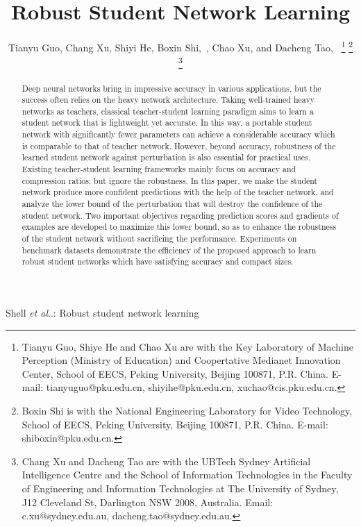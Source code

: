 \documentclass[journal]{IEEEtran}
\makeatletter
\DeclareRobustCommand\onedot{\futurelet\@let@token\@onedot}
\def\@onedot{\ifx\@let@token.\else.\null\fi\xspace}
\def\etal{\emph{et al}\onedot}
\makeatother
\begin{document}
\title{Robust Student Network Learning}

\author{Tianyu Guo, Chang Xu, Shiyi He, Boxin Shi,~, Chao Xu, and Dacheng Tao,~%
\thanks{Tianyu Guo, Shiye He and Chao Xu are with the Key Laboratory of Machine Perception (Ministry of Education) and Coopertative Medianet Innovation Center, School of EECS, Peking University, Beijing 100871, P.R. China. E-mail: tianyuguo@pku.edu.cn, shiyihe@pku.edu.cn, xuchao@cis.pku.edu.cn.}%
\thanks{Boxin Shi is with the National Engineering Laboratory for Video Technology, School of EECS, Peking University, Beijing 100871, P.R. China. E-mail: shiboxin@pku.edu.cn.}%
\thanks{Chang Xu and Dacheng Tao are with the UBTech Sydney Artificial Intelligence Centre and the School of Information Technologies in the Faculty of Engineering and Information Technologies at The University of Sydney, J12 Cleveland St, Darlington NSW 2008, Australia. Email: c.xu@sydney.edu.au, dacheng.tao@sydney.edu.au.}}%


\markboth{}%
{Shell \MakeLowercase{\etal}: Robust student network learning}

\maketitle

\begin{abstract}
Deep neural networks bring in impressive accuracy in various applications, but the success often relies on the heavy network architecture. Taking well-trained heavy networks as teachers, classical teacher-student learning paradigm aims to learn a student network that is lightweight yet accurate. In this way, a portable student network with significantly fewer parameters can achieve a considerable accuracy which is comparable to that of teacher network. However, beyond accuracy, robustness of the learned student network against perturbation is also essential for practical uses. 
Existing teacher-student learning frameworks mainly focus on accuracy and compression ratios, but ignore the robustness. In this paper, we make the student network produce more confident predictions with the help of the teacher network, and analyze the lower bound of the perturbation that will destroy the confidence of the student network. Two important objectives regarding prediction scores and gradients of examples are developed to maximize this lower bound, so as to enhance the robustness of the student network without sacrificing the performance. Experiments on benchmark datasets demonstrate the efficiency of the proposed approach to learn robust student networks which have satisfying accuracy and compact sizes.
\end{abstract}
\end{document}

